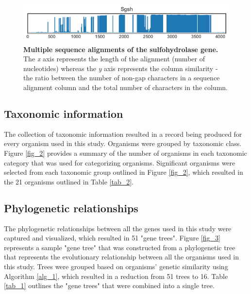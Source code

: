 \documentclass{article}
\begin{document}
\begin{figure}
\centering
\includegraphics[width=\textwidth]{./images/sulfohydrolase_msa.pdf}
\caption{\textbf{Multiple sequence alignments of the sulfohydrolase gene.} The \textit{x} axis represents the length of the alignment (number of nucleotides) whereas the \textit{y} axis represents the column similarity - the ratio between the number of non-gap characters in a sequence alignment column and the total number of characters in the column.}
\label{msa_fig_11}
\end{figure}

\subsection{Taxonomic information}
The collection of taxonomic information resulted in a record being produced for every organism used in this study. Organisms were grouped by taxonomic class. Figure \ref{fig_2} provides a summary of the number of organisms in each taxonomic category that was used for categorizing organisms. Significant organisms were selected from each taxonomic group outlined in Figure \ref{fig_2}, which resulted in the 21 organisms outlined in Table \ref{tab_2}.

\subsection{Phylogenetic relationships}
The phylogenetic relationships between all the genes used in this study were captured and visualized, which resulted in 51 "gene trees". Figure \ref{fig_3} represents a sample "gene tree" that was constructed from a phylogenetic tree that represents the evolutionary relationship between all the organisms used in this study. Trees were grouped based on organisms' genetic similarity using Algorithm \ref{alg_1}, which resulted in a reduction from 51 trees to 16. Table \ref{tab_1} outlines the "gene trees" that were combined into a single tree.
\end{document}
